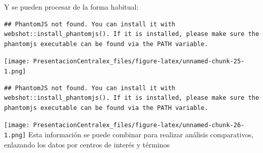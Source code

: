 \documentclass[
]{article}
\newenvironment{Shaded}{\begin{snugshade}}{\end{snugshade}}
\newcommand{\KeywordTok}[1]{\textcolor[rgb]{0.13,0.29,0.53}{\textbf{#1}}}
\newcommand{\NormalTok}[1]{#1}
\newcommand{\OperatorTok}[1]{\textcolor[rgb]{0.81,0.36,0.00}{\textbf{#1}}}
\newcommand{\StringTok}[1]{\textcolor[rgb]{0.31,0.60,0.02}{#1}}
\begin{document}
Y se pueden procesar de la forma habitual:

\begin{Shaded}
\end{Shaded}

\begin{verbatim}
## PhantomJS not found. You can install it with webshot::install_phantomjs(). If it is installed, please make sure the phantomjs executable can be found via the PATH variable.
\end{verbatim}

\texttt{[image: PresentacionCentralex\_files/figure-latex/unnamed-chunk-25-1.png]}

\begin{Shaded}
\end{Shaded}

\begin{verbatim}
## PhantomJS not found. You can install it with webshot::install_phantomjs(). If it is installed, please make sure the phantomjs executable can be found via the PATH variable.
\end{verbatim}

\texttt{[image: PresentacionCentralex\_files/figure-latex/unnamed-chunk-26-1.png]}
Esta información se puede combinar para realizar análisis comparativos,
enlazando los datos por centros de interés y términos
\end{document}
